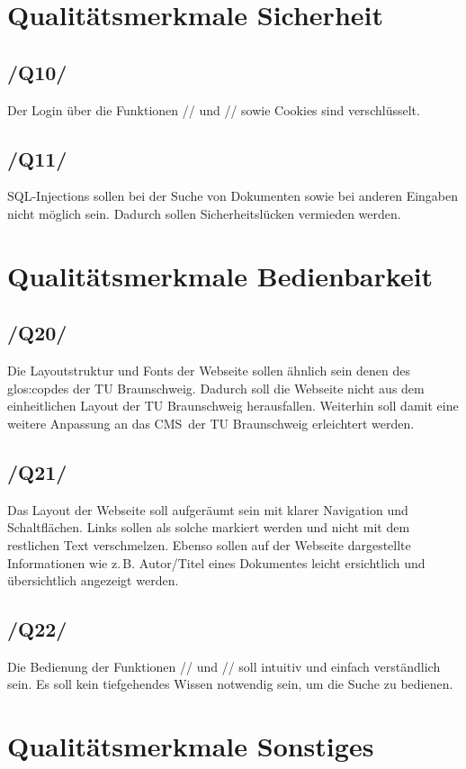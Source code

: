 \section{Qualitätsmerkmale Sicherheit}
\subsection{/Q10/} Der Login über die Funktionen // und // sowie Cookies sind verschlüsselt.
\subsection{/Q11/} SQL-Injections sollen bei der Suche von Dokumenten sowie bei anderen Eingaben nicht möglich sein. Dadurch sollen Sicherheitslücken vermieden werden.
\section{Qualitätsmerkmale Bedienbarkeit}
\subsection{/Q20/} Die Layoutstruktur und Fonts der Webseite sollen ähnlich sein denen des \Gls{glos:copdes} der TU Braunschweig. Dadurch soll die Webseite nicht aus dem einheitlichen Layout der TU Braunschweig herausfallen. Weiterhin soll damit eine weitere Anpassung an das \gls{CMS}\ der TU Braunschweig erleichtert werden.
\subsection{/Q21/} Das Layout der Webseite soll aufgeräumt sein mit klarer Navigation und Schaltflächen. Links sollen als solche markiert werden und nicht mit dem restlichen Text verschmelzen. Ebenso sollen auf der Webseite dargestellte Informationen wie \mbox{z.\,B.}\xspace Autor/Titel eines Dokumentes leicht ersichtlich und übersichtlich angezeigt werden.
\subsection{/Q22/} Die Bedienung der Funktionen // und // soll intuitiv und einfach verständlich sein. Es soll kein tiefgehendes Wissen notwendig sein, um die Suche zu bedienen.
\section{Qualitätsmerkmale Sonstiges}

